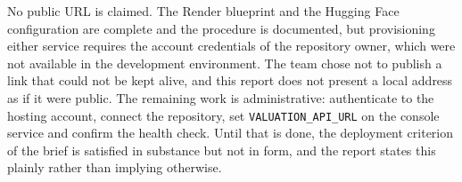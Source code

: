 No public URL is claimed. The Render blueprint and the Hugging Face configuration are
complete and the procedure is documented, but provisioning either service requires
the account credentials of the repository owner, which were not available in the
development environment. The team chose not to publish a link that could not be kept
alive, and this report does not present a local address as if it were public. The
remaining work is administrative: authenticate to the hosting account, connect the
repository, set \texttt{VALUATION\_API\_URL} on the console service and confirm the
health check. Until that is done, the deployment criterion of the brief is satisfied
in substance but not in form, and the report states this plainly rather than implying
otherwise.
